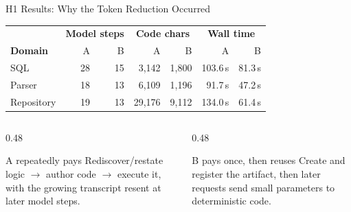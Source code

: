 \documentclass[aspectratio=169,11pt]{beamer}
\begin{document}
\begin{frame}{H1 Results: Why the Token Reduction Occurred}
  \scriptsize
  \renewcommand{\arraystretch}{1.18}
  \setlength{\tabcolsep}{3pt}
  \begin{tabular}{lrrrrrr}
    \toprule
    & \multicolumn{2}{c}{\textbf{Model steps}} &
      \multicolumn{2}{c}{\textbf{Code chars}} &
      \multicolumn{2}{c}{\textbf{Wall time}} \\
    \textbf{Domain} & A & B & A & B & A & B \\
    \midrule
    SQL & 28 & 15 & 3{,}142 & 1{,}800 & 103.6\,s & 81.3\,s \\
    Parser & 18 & 13 & 6{,}109 & 1{,}196 & 91.7\,s & 47.2\,s \\
    Repository & 19 & 13 & 29{,}176 & 9{,}112 & 134.0\,s & 61.4\,s \\
    \bottomrule
  \end{tabular}
  \vspace{0.28cm}
  \begin{columns}[T,totalwidth=\textwidth]
    \begin{column}{0.48\textwidth}
      \begin{block}{A repeatedly pays}
        Rediscover/restate logic $\rightarrow$ author code $\rightarrow$ execute
        it, with the growing transcript resent at later model steps.
      \end{block}
    \end{column}
    \begin{column}{0.48\textwidth}
      \begin{exampleblock}{B pays once, then reuses}
        Create and register the artifact, then later requests send small
        parameters to deterministic code.
      \end{exampleblock}
    \end{column}
  \end{columns}
\end{frame}
\end{document}
